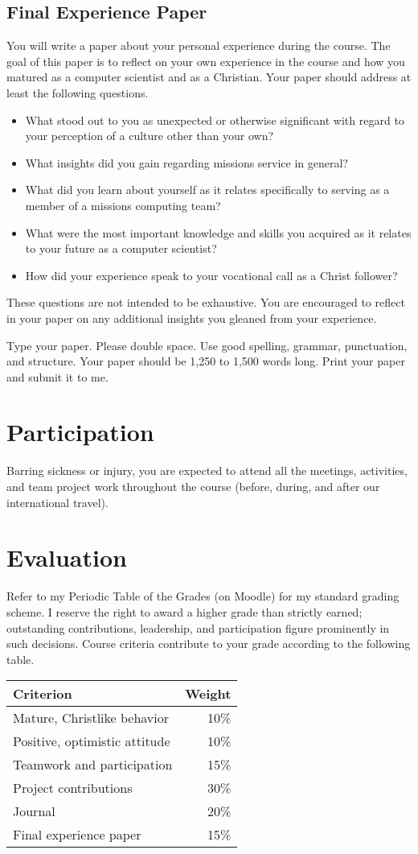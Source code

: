 \documentclass{article}
\begin{document}
\subsection{Final Experience Paper}
\label{sec:orgheadline9}
You will write a paper about your personal experience during the course. The goal of this
paper is to reflect on your own experience in the course and how you matured as a computer
scientist and as a Christian.  Your paper should address at least the following questions.
\begin{itemize}
\item What stood out to you as unexpected or otherwise significant with regard to your
perception of a culture other than your own?
\item What insights did you gain regarding missions service in general?
\item What did you learn about yourself as it relates specifically to serving as a member of a
missions computing team?
\item What were the most important knowledge and skills you acquired as it relates to your
future as a computer scientist?
\item How did your experience speak to your vocational call as a Christ follower?
\end{itemize}
These questions are not intended to be exhaustive. You are encouraged to reflect in your
paper on any additional insights you gleaned from your experience.

Type your paper. Please double space. Use good spelling, grammar, punctuation, and
structure. Your paper should be 1,250 to 1,500 words long. Print your paper and submit it
to me.
\section{Participation}
\label{sec:orgheadline11}
Barring sickness or injury, you are expected to attend all the meetings, activities, and
team project work throughout the course (before, during, and after our international
travel).
\section{Evaluation}
\label{sec:orgheadline12}
Refer to my Periodic Table of the Grades (on Moodle) for my standard grading scheme. I
reserve the right to award a higher grade than strictly earned; outstanding contributions,
leadership, and participation figure prominently in such decisions.  Course criteria
contribute to your grade according to the following table.
\begin{center}
\begin{tabular}{lr}
Criterion & Weight\\
\hline
Mature, Christlike behavior & 10\%\\
Positive, optimistic attitude & 10\%\\
Teamwork and participation & 15\%\\
Project contributions & 30\%\\
Journal & 20\%\\
Final experience paper & 15\%\\
\end{tabular}
\end{center}
\end{document}
